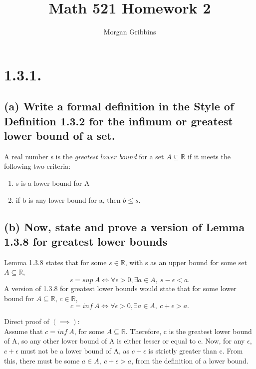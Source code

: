 \documentclass[12pt,letterpaper]{article}
\title{Math 521 Homework 2}
\author{Morgan Gribbins}
\begin{document}
	
\maketitle

\section{1.3.1.}
	
\subsection{(a) Write a formal definition in the Style of Definition 1.3.2 for the infimum or greatest lower bound of a set.}
	
	A real number s is the \textit{greatest lower bound} for a set \(A \subseteq \mathbb{R}\) if it meets the following two criteria:
	
	\begin{enumerate}
		
		\item s is a lower bound for A
		
		\item if b is any lower bound for a, then \(b \leq s\).
		
	\end{enumerate}

\subsection{(b) Now, state and prove a version of Lemma 1.3.8 for greatest lower bounds}

	Lemma 1.3.8 states that for some \(s \in \mathbb{R}\), with s as an upper bound for some set \(A \subseteq \mathbb{R}\), \[s = sup\ A \iff \forall \epsilon > 0, \exists a \in A,\ s - \epsilon < a.\] A version of 1.3.8 for greatest lower bounds would state that for some lower bound for \(A \subseteq \mathbb{R}\), \(c \in \mathbb{R}\), \[c = inf\ A \iff \forall \epsilon > 0, \exists a \in A,\ c + \epsilon > a.\]
	
	Direct proof of \((\implies)\): \\
	
	Assume that \(c = inf\ A\), for some \(A \subseteq \mathbb{R}\). Therefore, c is the greatest lower bound of A, so any other lower bound of A is either lesser or equal to c. Now, for any \(\epsilon\), \(c + \epsilon\) must not be a lower bound of A, as \(c + \epsilon\) is strictly greater than c. From this, there must be some \(a \in A,\ c + \epsilon > a\), from the definition of a lower bound. \\
	
\end{document}
